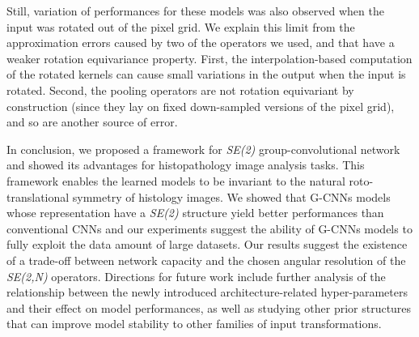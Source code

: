 \documentclass[twocolumn,final]{article}
\newcommand{\se}[1]{\textit{SE(#1)}}
\begin{document}
Still, variation of performances for these models was also observed when the input was rotated out of the pixel grid.
We explain this limit from the approximation errors caused by two of the operators we used, and that have a weaker rotation equivariance property.
First, the interpolation-based computation of the rotated kernels can cause small variations in the output when the input is rotated.
Second, the pooling operators are not rotation equivariant by construction (since they lay on fixed down-sampled versions of the pixel grid), and so are another source of error.

In conclusion, we proposed a framework for \se{2} group-convolutional network and showed its advantages for histopathology image analysis tasks.
This framework enables the learned models to be invariant to the natural roto-translational symmetry of histology images.
We showed that G-CNNs models whose representation have a \se{2} structure yield better performances than conventional CNNs and our experiments suggest the ability of G-CNNs models to fully exploit the data amount of large datasets.
Our results suggest the existence of a trade-off between network capacity and the chosen angular resolution of the \se{2,N} operators.
Directions for future work include further analysis of the relationship between the newly introduced architecture-related hyper-parameters and their effect on model performances, as well as studying other prior structures that can improve model stability to other families of input transformations.



\balance

\end{document}
